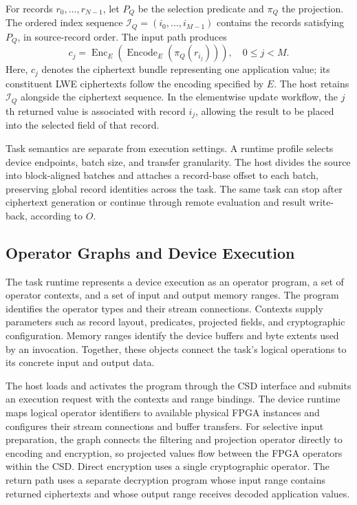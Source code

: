 For records $r_0,\ldots,r_{N-1}$, let $P_Q$ be the selection predicate and $\pi_Q$ the projection. The ordered index sequence $\mathcal{I}_Q=(i_0,\ldots,i_{M-1})$ contains the records satisfying $P_Q$, in source-record order. The input path produces
\begin{equation}
  c_j = \operatorname{Enc}_{E}\!\left(
    \operatorname{Encode}_{E}\!\left(\pi_Q(r_{i_j})\right)
  \right),\quad 0\leq j<M.
  \label{eq:task-ciphertexts}
\end{equation}
Here, $c_j$ denotes the ciphertext bundle representing one application value; its constituent LWE ciphertexts follow the encoding specified by $E$. The host retains $\mathcal{I}_Q$ alongside the ciphertext sequence. In the elementwise update workflow, the $j$th returned value is associated with record $i_j$, allowing the result to be placed into the selected field of that record.

Task semantics are separate from execution settings. A runtime profile selects device endpoints, batch size, and transfer granularity. The host divides the source into block-aligned batches and attaches a record-base offset to each batch, preserving global record identities across the task. The same task can stop after ciphertext generation or continue through remote evaluation and result write-back, according to $O$.

\subsection{Operator Graphs and Device Execution}
\label{subsec:operator-execution}

The task runtime represents a device execution as an operator program, a set of operator contexts, and a set of input and output memory ranges. The program identifies the operator types and their stream connections. Contexts supply parameters such as record layout, predicates, projected fields, and cryptographic configuration. Memory ranges identify the device buffers and byte extents used by an invocation. Together, these objects connect the task's logical operations to its concrete input and output data.

The host loads and activates the program through the CSD interface and submits an execution request with the contexts and range bindings. The device runtime maps logical operator identifiers to available physical FPGA instances and configures their stream connections and buffer transfers. For selective input preparation, the graph connects the filtering and projection operator directly to encoding and encryption, so projected values flow between the FPGA operators within the CSD. Direct encryption uses a single cryptographic operator. The return path uses a separate decryption program whose input range contains returned ciphertexts and whose output range receives decoded application values.

